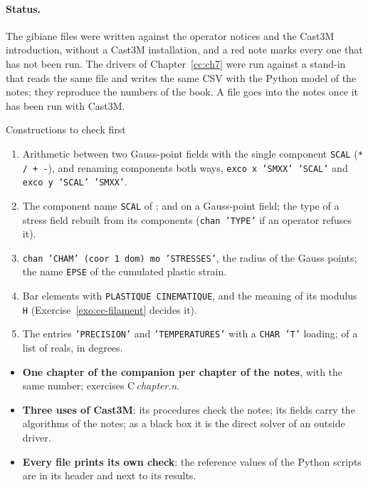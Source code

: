 \paragraph{Status.}
The gibiane files were written against the operator notices and the Cast3M
introduction, without a Cast3M installation, and a red note marks every one
that has not been run. The drivers of Chapter~\ref{cc:ch7} were run against a
stand-in that reads the same file and writes the same CSV with the Python model
of the notes; they reproduce the numbers of the book. A file goes into the notes
once it has been run with Cast3M.

\begin{gbox}{Constructions to check first}\label{cc:box-check}
\small
\begin{enumerate}[label=\textbf{\arabic*.},leftmargin=*,itemsep=1pt]
\item Arithmetic between two Gauss-point fields with the single component
  \texttt{SCAL} (\texttt{* / + -}), and  renaming components both
  ways, \texttt{exco x 'SMXX' 'SCAL'} and \texttt{exco y 'SCAL' 'SMXX'}.
\item The component name \texttt{SCAL} of ;  and 
  on a Gauss-point field; the type of a stress field rebuilt from its
  components (\texttt{chan 'TYPE'} if an operator refuses it).
\item \texttt{chan 'CHAM' (coor 1 dom) mo 'STRESSES'}, the radius of the
  Gauss points; the name \texttt{EPSE} of the cumulated plastic strain.
\item Bar elements with \texttt{PLASTIQUE CINEMATIQUE}, and the meaning of
  its modulus \texttt{H} (Exercise~\ref{exo:cc-filament} decides it).
\item The  entries \texttt{'PRECISION'} and
  \texttt{'TEMPERATURES'} with a \texttt{CHAR 'T'} loading;  of a
  list of reals, in degrees.
\end{enumerate}
\end{gbox}


\begin{gbox*}
\begin{itemize}
\item \textbf{One chapter of the companion per chapter of the notes}, with
  the same number; exercises C\,\textit{chapter}.\textit{n}.
\item \textbf{Three uses of Cast3M}: its procedures check the notes; its
  fields carry the algorithms of the notes; as a black box it is the direct
  solver of an outside driver.
\item \textbf{Every file prints its own check}: the reference values of the
  Python scripts are in its header and next to its results.
\end{itemize}
\end{gbox*}

